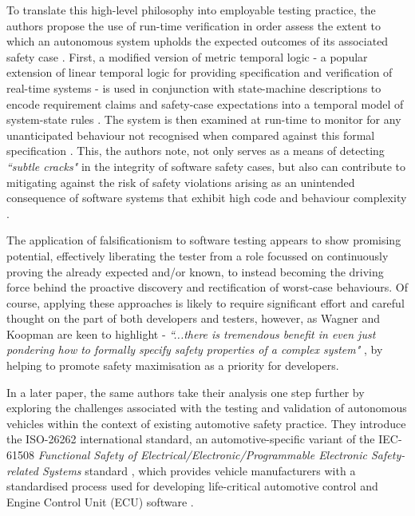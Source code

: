\documentclass[conference]{IEEEtran}
\begin{document}
 To translate this high-level philosophy into employable testing practice, the authors propose the use of run-time verification in order assess the extent to which an autonomous system upholds the expected outcomes of its associated safety case \cite{wagner-1}. First, a modified version of metric temporal logic - a popular extension of linear temporal logic for providing specification and verification of real-time systems - is used in conjunction with state-machine descriptions to encode requirement claims and safety-case expectations into a temporal model of system-state rules \cite{wagner-1}. The system is then examined at run-time to monitor for any unanticipated behaviour not recognised when compared against this formal specification \cite{wagner-1}. This, the authors note, not only serves as a means of detecting \textit{``subtle cracks"} in the integrity of software safety cases, but also can contribute to mitigating against the risk of safety violations arising as an unintended consequence of software systems that exhibit high code and behaviour complexity \cite{wagner-1}.
 
The application of falsificationism to software testing appears to show promising potential, effectively liberating the tester from a role focussed on continuously proving the already expected and/or known, to instead becoming the driving force behind the proactive discovery and rectification of worst-case behaviours. Of course, applying these approaches is likely to require significant effort and careful thought on the part of both developers and testers, however, as Wagner and Koopman are keen to highlight - \textit{``...there is tremendous benefit in even just pondering how to formally specify safety properties of a complex system"} \cite{wagner-1}, by helping to promote safety maximisation as a priority for developers.

In a later paper, the same authors take their analysis one step further by exploring the challenges associated with the testing and validation of autonomous vehicles within the context of existing automotive safety practice. They introduce the ISO-26262 international standard, an automotive-specific variant of the IEC-61508 \textit{Functional Safety of Electrical/Electronic/Programmable Electronic Safety-related Systems} standard \cite{iec-61508}, which provides vehicle manufacturers with a standardised process used for developing life-critical automotive control and Engine Control Unit (ECU) software \cite{iso-26262}. 
\end{document}
